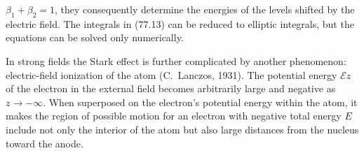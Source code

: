 $\beta_1+\beta_2=1$, they consequently determine the energies of the levels shifted by the electric field. The integrals in (77.13) can be reduced to elliptic integrals, but the equations can be solved only numerically.

In strong fields the Stark effect is further complicated by another phenomenon: electric-field ionization of the atom (C.~Lanczos, 1931). The potential energy $\mathcal Ez$ of the electron in the external field becomes arbitrarily large and negative as $z\to-\infty$. When superposed on the electron's potential energy within the atom, it makes the region of possible motion for an electron with negative total energy $E$ include not only the interior of the atom but also large distances from the nucleus toward the anode.

\setcounter{figure}{24}
\begin{figure}[ht]
\centering
\begin{minipage}{.43\linewidth}\centering
{}
\caption{ }\label{fig:25}
\end{minipage}\hfill
\begin{minipage}{.43\linewidth}\centering
{}
\caption{ }\label{fig:26}
\end{minipage}
\end{figure}

